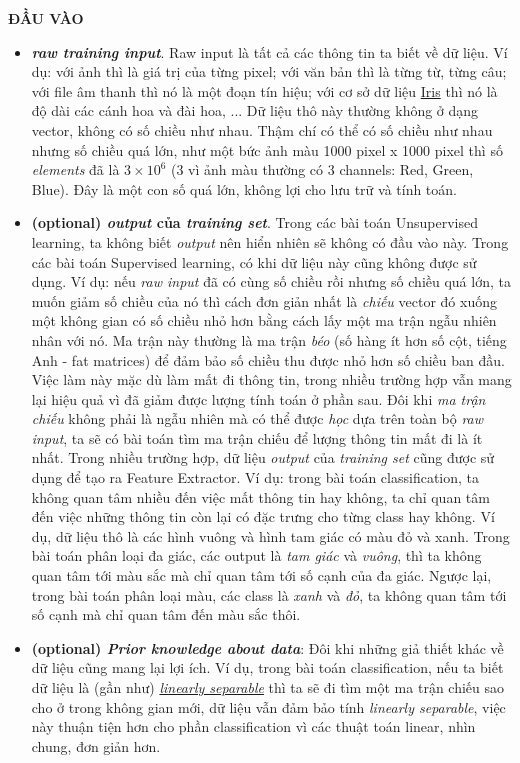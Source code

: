 \textbf{ĐẦU VÀO} 
\begin{itemize}
    \item \textbf{\textit{raw training input}}. Raw input là tất cả các thông tin ta biết về dữ liệu. Ví dụ: với ảnh thì là giá trị của từng pixel; với văn bản thì là từng từ, từng câu; với file âm thanh thì nó là một đoạn tín hiệu; với cơ sở dữ liệu \href{http://machinelearningcoban.com/2017/01/08/knn/#bo-co-so-du-lieu-iris-iris-flower-dataset}{Iris} thì nó là độ dài các cánh hoa và đài hoa, ... Dữ liệu thô này thường không ở dạng vector, không có số chiều như nhau. Thậm chí có thể có số chiều như nhau nhưng số chiều quá lớn, như một bức ảnh màu 1000 pixel x 1000 pixel thì số \textit{elements} đã là $3 \times 10^6$ (3 vì ảnh màu thường có 3 channels: Red, Green, Blue). Đây là một con số quá lớn, không lợi cho lưu trữ và tính toán.  

    \item \textbf{(optional) \textit{output} của \textit{training set}}. Trong các bài toán Unsupervised learning, ta không biết \textit{output} nên hiển nhiên sẽ không có đầu vào này. Trong các bài toán Supervised learning, có khi dữ liệu này cũng không được sử dụng. Ví dụ: nếu \textit{raw input} đã có cùng số chiều rồi nhưng số chiều quá lớn,  ta muốn giảm số chiều của nó thì cách đơn giản nhất là \textit{chiếu} vector đó xuống một không gian có số chiều nhỏ hơn bằng cách lấy một ma trận ngẫu nhiên nhân với nó. Ma trận này thường là ma trận \textit{béo} (số hàng ít hơn số cột, tiếng Anh - fat matrices) để đảm bảo số chiều thu được nhỏ hơn số chiều ban đầu. Việc làm này mặc dù làm mất đi thông tin, trong nhiều trường hợp vẫn mang lại hiệu quả vì đã giảm được lượng tính toán ở phần sau. Đôi khi \textit{ma trận chiếu} không phải là ngẫu nhiên mà có thể được \textit{học} dựa trên toàn bộ \textit{raw input}, ta sẽ có bài toán tìm ma trận chiếu để lượng thông tin mất đi là ít nhất. Trong nhiều trường hợp, dữ liệu \textit{output} của \textit{training set} cũng được sử dụng để tạo ra Feature Extractor. Ví dụ: trong bài toán classification, ta không quan tâm nhiều đến việc mất thông tin hay không, ta chỉ quan tâm đến việc những thông tin còn lại có đặc trưng cho từng class hay không. Ví dụ, dữ liệu thô là các hình vuông và hình tam giác có màu đỏ và xanh. Trong bài toán phân loại đa giác, các output là \textit{tam giác} và \textit{vuông},  thì ta không quan tâm tới màu sắc mà chỉ quan tâm tới số cạnh của đa giác. Ngược lại, trong bài toán phân loại màu, các class là \textit{xanh} và \textit{đỏ}, ta không quan tâm tới số cạnh mà chỉ quan tâm đến màu sắc thôi.  

    \item \textbf{(optional) \textit{Prior knowledge about data}}: Đôi khi những giả thiết khác về dữ liệu cũng mang lại lợi ích. Ví dụ, trong bài toán classification, nếu ta biết dữ liệu là (gần như) \href{http://machinelearningcoban.com/2017/01/21/perceptron/#bai-toan-perceptron}{ \textit{linearly separable}} thì ta sẽ đi tìm một ma trận chiếu sao cho ở trong không gian mới, dữ liệu vẫn đảm bảo tính \textit{linearly separable}, việc này thuận tiện hơn cho phần classification vì các thuật toán linear, nhìn chung, đơn giản hơn.  
\end{itemize}
 
